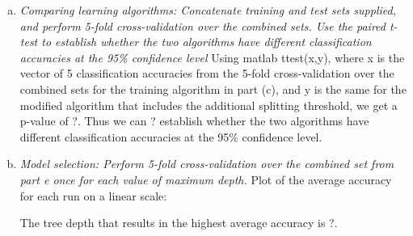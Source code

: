 \documentclass{article}
\begin{document}
\begin{enumerate}[(a)]
\item \emph{Comparing learning algorithms: Concatenate training and test sets supplied, and perform 5-fold cross-validation over the combined sets. Use the paired t-test to establish whether the two algorithms have different classification accuracies at the 95\% confidence level} Using matlab ttest(x,y), where x is the vector of 5 classification accuracies from the 5-fold cross-validation over the combined sets for the training algorithm in part (c), and y is the same for the modified algorithm that includes the additional splitting threshold, we get a p-value of ?. Thus we can ? establish whether the two algorithms have different classification accuracies at the 95\% confidence level.
\item \emph{Model selection: Perform 5-fold cross-validation over the combined set from part e once for each value of maximum depth.}
Plot of the average accuracy for each run on a linear scale:


The tree depth that results in the highest average accuracy is ?.
\end{enumerate}
\end{document}
